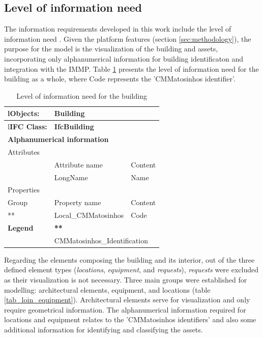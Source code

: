 \documentclass[a4paper, 10pt, twocolumn, twoside]{article}
\begin{document}
\subsection{Level of information need}
\label{subsec:loin}

The information requirements developed in this work include the level of information need \cite{17412-1}. Given the platform features (section \ref{sec:methodology}), the purpose for the model is the visualization of the building and assets, incorporating only alphanumerical information for building identificaton and integration with the IMMP. Table \ref{tab_loin_building} presents the level of information need for the building as a whole, where Code represents the 'CMMatosinhos identifier'.

\begin{table}[!htb]
    \renewcommand{\arraystretch}{2}
    \centering
    \caption{Level of information need for the building}
    \label{tab_loin_building}
    \begin{tabular}{l|l|l}
    \hline
    {l}\textbf{Objects:} & \multicolumn{2}{l}{\textbf{Building}}\\
    \hline
    {l}\textbf{IFC Class:} & \multicolumn{2}{l}{\textbf{IfcBuilding}}\\
    \hline
    \multicolumn{3}{l}{\textbf{Alphanumerical information}} \\
    \hline
    \multicolumn{3}{l}{Attributes} \\
    \hline
    & Attribute name & Content\\
    \hline
    & LongName & Name\\
    \hline
    \multicolumn{3}{l}{Properties} \\
    \hline
    Group & Property name & Content\\
    \hline
    ** & Local\_CMMatosinhos & Code\\
    \hline
    \textbf{Legend} & \multicolumn{2}{l}{\textbf{**}}\\
    & \multicolumn{2}{l}{CMMatosinhos\_Identification}\\
    \hline
    \end{tabular}
\end{table}

Regarding the elements composing the building and its interior, out of the three defined element types (\emph{locations}, \emph{equipment}, and \emph{requests}), \emph{requests} were excluded as their visualization is not necessary. Three main groups were established for modelling: architectural elements, equipment, and locations (table \ref{tab_loin_equipment}). Architectural elements serve for visualization and only require geometrical information. The alphanumerical information required for locations and equipment relates to the 'CMMatosinhos identifiers' and also some additional information for identifying and classifying the assets.
\end{document}
